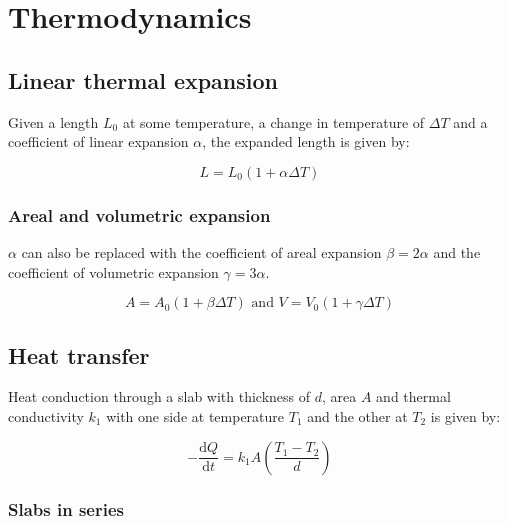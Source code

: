 \documentclass[12pt]{article}
\begin{document}
\newpage

\section{Thermodynamics}

\subsection{Linear thermal expansion}

Given a length $L_0$ at some temperature, a change in temperature of $\Delta T$ and a coefficient of linear expansion $\alpha$, the expanded length is given by:

\[
\boxed{
L = L_0(1+\alpha \Delta T)
}
\]

\subsubsection{Areal and volumetric expansion}

$\alpha$ can also be replaced with the coefficient of areal expansion $\beta=2\alpha$ and the coefficient of volumetric expansion $\gamma=3\alpha$.

\[
\boxed{A = A_0(1+\beta \Delta T)} \text{ and } \boxed{V = V_0(1 + \gamma \Delta T)}
\]

\subsection{Heat transfer}

Heat conduction through a slab with thickness of $d$, area $A$ and thermal conductivity $k_1$ with one side at temperature $T_1$ and the other at $T_2$ is given by:

\[
\boxed{
-\frac{\mathrm{d}Q}{\mathrm{d}t} = k_1 A \left(\frac{T_1 - T_2}{d}\right)
}
\]

\subsubsection{Slabs in series}
\end{document}
